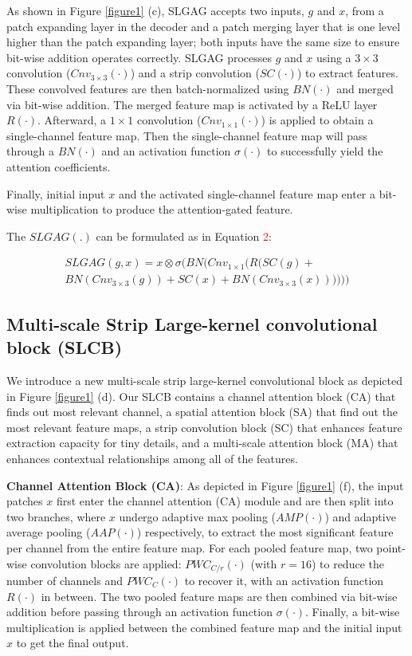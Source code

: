\documentclass[letterpaper, 10 pt, conference]{ieeeconf}  %
\begin{document}
As shown in Figure \textcolor{red}{\ref{figure1}} (c), SLGAG accepts two inputs, $g$ and $x$, from a patch expanding layer in the decoder and a patch merging layer that is one level higher than the patch expanding layer; both inputs have the same size to ensure bit-wise addition operates correctly. SLGAG processes $g$ and $x$ using a $3 \times 3$ convolution ($Cnv_{3\times 3}(\cdot)$) and a strip convolution ($SC(\cdot)$) to extract features. These convolved features are then batch-normalized using $BN(\cdot)$ and merged via bit-wise addition. The merged feature map is activated by a ReLU layer $R(\cdot)$. Afterward, a $1 \times 1$ convolution ($Cnv_{1\times 1}(\cdot)$) is applied to obtain a single-channel feature map. Then the single-channel feature map will pass through a $BN(\cdot)$ and an activation function $\sigma(\cdot)$ to successfully yield the attention coefficients. 

Finally, initial input $x$ and the activated single-channel feature map enter a bit-wise multiplication to produce the attention-gated feature.

The $SLGAG(.)$ can be formulated as in Equation \textcolor{red}{2}: 
\begin{scriptsize}
\begin{align}\nonumber
	SLGAG(g,x) = x \otimes \sigma(BN(Cnv_{1\times 1}(R(SC(g) + \\BN(Cnv_{3\times 3}(g)) + SC(x) + BN(Cnv_{3\times 3}(x))))))
\end{align}
\end{scriptsize}

\subsection{Multi-scale Strip Large-kernel convolutional block (SLCB)}

We introduce a new multi-scale strip large-kernel convolutional block as depicted in Figure \textcolor{red}{\ref{figure1}} (d). Our SLCB contains a channel attention block (CA) that finds out most relevant channel, a spatial attention block (SA) that find out the most relevant feature maps, a strip convolution block (SC) that enhances feature extraction capacity for tiny details, and a multi-scale attention block (MA) that enhances contextual relationships among all of the features.

\textbf{Channel Attention Block (CA)}\cite{woo2018cbam}: As depicted in Figure \textcolor{red}{\ref{figure1}} (f), the input patches $x$ first enter the channel attention (CA) module and are then split into two branches, where $x$ undergo adaptive max pooling ($AMP(\cdot)$) and adaptive average pooling ($AAP(\cdot)$) respectively, to extract the most significant feature per channel from the entire feature map. For each pooled feature map, two point-wise convolution blocks are applied: $PWC_{C/r}(\cdot)$ (with $r=16$) to reduce the number of channels and $PWC_C(\cdot)$ to recover it, with an activation function $R(\cdot)$ in between. The two pooled feature maps are then combined via bit-wise addition before passing through an activation function $\sigma(\cdot)$. Finally, a bit-wise multiplication is applied between the combined feature map and the initial input $x$ to get the final output.
\end{document}
